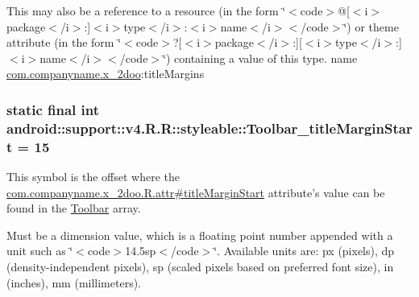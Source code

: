 This may also be a reference to a resource (in the form \char`\"{}$<$code$>$@\mbox{[}$<$i$>$package$<$/i$>$:\mbox{]}$<$i$>$type$<$/i$>$:$<$i$>$name$<$/i$>$$<$/code$>$\char`\"{}) or theme attribute (in the form \char`\"{}$<$code$>$?\mbox{[}$<$i$>$package$<$/i$>$:\mbox{]}\mbox{[}$<$i$>$type$<$/i$>$:\mbox{]}$<$i$>$name$<$/i$>$$<$/code$>$\char`\"{}) containing a value of this type.  name \hyperlink{namespacecom_1_1companyname_1_1x__2doo}{com.companyname.x\_\-2doo}:titleMargins \hypertarget{classandroid_1_1support_1_1v4_1_1_r_1_1styleable_037398ad6eb4fa7d2271f386c71d7350}{
\subsubsection[{Toolbar\_\-titleMarginStart}]{\setlength{\rightskip}{0pt plus 5cm}static final int android::support::v4.R.R::styleable::Toolbar\_\-titleMarginStart = 15}}
\label{classandroid_1_1support_1_1v4_1_1_r_1_1styleable_037398ad6eb4fa7d2271f386c71d7350}


This symbol is the offset where the \hyperlink{classcom_1_1companyname_1_1x__2doo_1_1_r_1_1attr_f6e10ded72b8728c215df0126a226b7e}{com.companyname.x\_\-2doo.R.attr\#titleMarginStart} attribute's value can be found in the \hyperlink{classandroid_1_1support_1_1v4_1_1_r_1_1styleable_0646d71cfbd4a8645c7d805b33e1c574}{Toolbar} array.

Must be a dimension value, which is a floating point number appended with a unit such as \char`\"{}$<$code$>$14.5sp$<$/code$>$\char`\"{}. Available units are: px (pixels), dp (density-independent pixels), sp (scaled pixels based on preferred font size), in (inches), mm (millimeters). 

